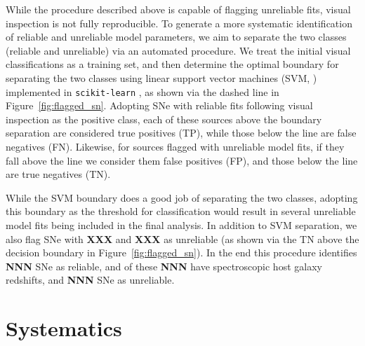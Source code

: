 \documentclass[twocolumn]{aastex63}
\begin{document}
While the procedure described above is capable of flagging unreliable fits,
visual inspection is not fully reproducible. To generate a more systematic
identification of reliable and unreliable model parameters, we aim to
separate the two classes (reliable and unreliable) via an automated
procedure. We treat the initial visual classifications as a training set, and
then determine the optimal boundary for separating the two classes using
linear support vector machines (SVM, \citealt{Cortes95}) implemented in
\texttt{scikit-learn} \citep{Pedregosa11}, as shown via the dashed line in
Figure~\ref{fig:flagged_sn}. Adopting SNe with reliable fits following visual
inspection as the positive class, each of these sources above the boundary
separation are considered true positives (TP), while those below the line are
false negatives (FN). Likewise, for sources flagged with unreliable model
fits, if they fall above the line we consider them false positives (FP), and
those below the line are true negatives (TN).

While the SVM boundary does a good job of separating the two classes,
adopting this boundary as the threshold for classification would result in
several unreliable model fits being included in the final analysis. In
addition to SVM separation, we also flag SNe with \textbf{XXX} and
\textbf{XXX} as unreliable (as shown via the TN above the decision boundary
in Figure~\ref{fig:flagged_sn}). In the end this procedure identifies
\textbf{NNN} SNe as reliable, and of these \textbf{NNN} have spectroscopic
host galaxy redshifts, and \textbf{NNN} SNe as unreliable.

\section{Systematics\label{sec:systematics}}






\end{document}
